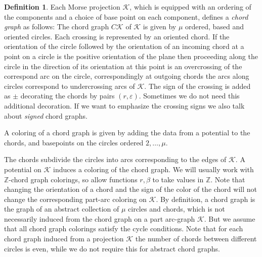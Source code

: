 \documentclass[11pt]{article}
\theoremstyle{definition}
\newtheorem{defn}{Definition}[section]
\theoremstyle{remark}
\theoremstyle{remark}
\begin{document}
\begin{defn} Each Morse projection $\mathcal{K}$, which is equipped with an ordering of the components and a choice of base point on each component, defines a \textit{chord graph} as follows: The chord graph $C\mathcal{K}$ of $\mathcal{K}$ is given by $\mu $ ordered, based and oriented circles. Each crossing is represented by an oriented chord. If the orientation of the circle followed by the orientation of an incoming chord at a point on a circle is the positive orientation of the plane then proceeding along the circle in the direction of its orientation at this point is an overcrossing of the correspond arc on the circle, correspondingly at outgoing chords the arcs along circles correspond to undercrossing arcs of $\mathcal{K}$. 
The sign of the crossing is added as $\pm $ decorating the chords by pairs $(r,\varepsilon )$. Sometimes we do not need this additional decoration. If we want to emphasize the crossing signs we also talk about \textit{signed} chord graphs. 

A coloring of a chord graph is given by adding the data from a potential to the chords, and basepoints on the circles ordered $2,\ldots ,\mu$.  
\end{defn}

The chords subdivide the circles into arcs corresponding to the edges of $\mathcal{K}$. A potential on $\mathcal{K}$ induces a coloring of the chord graph. We will usually work with $\mathbb{Z}$-chord graph colorings, so allow functions $r,\beta $ to take values in $\mathbb{Z}$. Note that changing the orientation of a chord and the sign of the color of the chord will not change the corresponding part-arc coloring on $\mathcal{K}$. By definition, a chord graph is the graph of an abstract collection of $\mu$ circles and chords, which is not necessarily induced from the chord graph on a part arc-graph $\mathcal{K}$. But we assume that all chord graph colorings satisfy the cycle conditions. Note that for each chord graph induced from a projection $\mathcal{K}$ the number of chords between different circles is even, while we do not require this for abstract chord graphs. 
\end{document}
